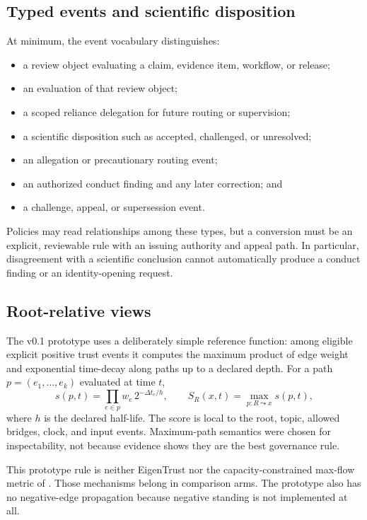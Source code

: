 \documentclass[11pt]{article}
\begin{document}
\subsection{Typed events and scientific disposition}

At minimum, the event vocabulary distinguishes:

\begin{itemize}
  \item a review object evaluating a claim, evidence item, workflow, or release;
  \item an evaluation of that review object;
  \item a scoped reliance delegation for future routing or supervision;
  \item a scientific disposition such as accepted, challenged, or unresolved;
  \item an allegation or precautionary routing event;
  \item an authorized conduct finding and any later correction; and
  \item a challenge, appeal, or supersession event.
\end{itemize}

Policies may read relationships among these types, but a conversion must be an
explicit, reviewable rule with an issuing authority and appeal path. In particular,
disagreement with a scientific conclusion cannot automatically produce a conduct
finding or an identity-opening request.

\subsection{Root-relative views}

The v0.1 prototype uses a deliberately simple reference function: among eligible
explicit positive trust events it computes the maximum product of edge weight and
exponential time-decay along paths up to a declared depth. For a path
$p=(e_1,\ldots,e_k)$ evaluated at time $t$,
\begin{equation}
s(p,t)=\prod_{e\in p} w_e\,2^{-\Delta t_e/h}, \qquad
S_R(x,t)=\max_{p:R\leadsto x}s(p,t),
\end{equation}
where $h$ is the declared half-life. The score is local to the root, topic, allowed
bridges, clock, and input events. Maximum-path semantics were chosen for
inspectability, not because evidence shows they are the best governance rule.

This prototype rule is neither EigenTrust nor the capacity-constrained max-flow
metric of \citet{levien1998attack}. Those mechanisms belong in comparison arms.
The prototype also has no negative-edge propagation because negative standing is
not implemented at all.
\end{document}

